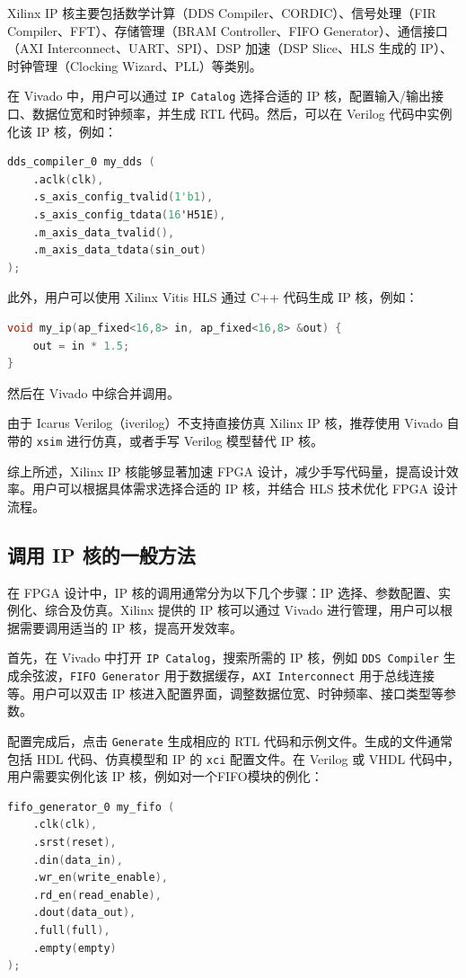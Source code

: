 \documentclass[lang=cn,newtx,10pt,scheme=chinese]{elegantbook}
\begin{document}
Xilinx IP 核主要包括数学计算（DDS Compiler、CORDIC）、信号处理（FIR Compiler、FFT）、存储管理（BRAM Controller、FIFO Generator）、通信接口（AXI Interconnect、UART、SPI）、DSP 加速（DSP Slice、HLS 生成的 IP）、时钟管理（Clocking Wizard、PLL）等类别。

在 Vivado 中，用户可以通过 \texttt{IP Catalog} 选择合适的 IP 核，配置输入/输出接口、数据位宽和时钟频率，并生成 RTL 代码。然后，可以在 Verilog 代码中实例化该 IP 核，例如：
\begin{lstlisting}[language=verilog]
dds_compiler_0 my_dds (
    .aclk(clk), 
    .s_axis_config_tvalid(1'b1),  
    .s_axis_config_tdata(16'H51E), 
    .m_axis_data_tvalid(),   
    .m_axis_data_tdata(sin_out) 
);
\end{lstlisting}

此外，用户可以使用 Xilinx Vitis HLS 通过 C++ 代码生成 IP 核，例如：
\begin{lstlisting}[language=C++]
void my_ip(ap_fixed<16,8> in, ap_fixed<16,8> &out) {
    out = in * 1.5;
}
\end{lstlisting}
然后在 Vivado 中综合并调用。

由于 Icarus Verilog（iverilog）不支持直接仿真 Xilinx IP 核，推荐使用 Vivado 自带的 \texttt{xsim} 进行仿真，或者手写 Verilog 模型替代 IP 核。

综上所述，Xilinx IP 核能够显著加速 FPGA 设计，减少手写代码量，提高设计效率。用户可以根据具体需求选择合适的 IP 核，并结合 HLS 技术优化 FPGA 设计流程。
\subsection{调用 IP 核的一般方法}

在 FPGA 设计中，IP 核的调用通常分为以下几个步骤：IP 选择、参数配置、实例化、综合及仿真。Xilinx 提供的 IP 核可以通过 Vivado 进行管理，用户可以根据需要调用适当的 IP 核，提高开发效率。

首先，在 Vivado 中打开 \texttt{IP Catalog}，搜索所需的 IP 核，例如 \texttt{DDS Compiler} 生成余弦波，\texttt{FIFO Generator} 用于数据缓存，\texttt{AXI Interconnect} 用于总线连接等。用户可以双击 IP 核进入配置界面，调整数据位宽、时钟频率、接口类型等参数。

配置完成后，点击 \texttt{Generate} 生成相应的 RTL 代码和示例文件。生成的文件通常包括 HDL 代码、仿真模型和 IP 的 \texttt{xci} 配置文件。在 Verilog 或 VHDL 代码中，用户需要实例化该 IP 核，例如对一个FIFO模块的例化：
\begin{lstlisting}[language=verilog]
fifo_generator_0 my_fifo (
    .clk(clk),
    .srst(reset),
    .din(data_in),
    .wr_en(write_enable),
    .rd_en(read_enable),
    .dout(data_out),
    .full(full),
    .empty(empty)
);
\end{lstlisting}
\end{document}
